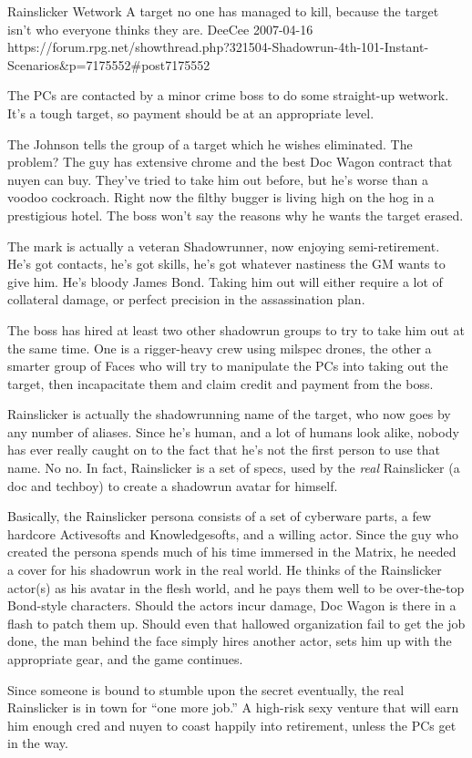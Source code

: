 \begin{scenario}{Rainslicker}
	{Wetwork}
	{A target no one has managed to kill, because the target isn't who everyone thinks they are.}
	{DeeCee}
	{2007-04-16}
	{https://forum.rpg.net/showthread.php?321504-Shadowrun-4th-101-Instant-Scenarios\&p=7175552\#post7175552}

The PCs are contacted by a minor crime boss to do some straight-up wetwork. It's a tough target, so payment should be at an appropriate level.

\synopsis The Johnson tells the group of a target which he wishes eliminated. The problem? The guy has extensive chrome and the best Doc Wagon contract that nuyen can buy. They've tried to take him out before, but he's worse than a voodoo cockroach. Right now the filthy bugger is living high on the hog in a prestigious hotel. The boss won't say the reasons why he wants the target erased.

The mark is actually a veteran Shadowrunner, now enjoying semi-retirement. He's got contacts, he's got skills, he's got whatever nastiness the GM wants to give him. He's bloody James Bond. Taking him out will either require a lot of collateral damage, or perfect precision in the assassination plan.

\twist The boss has hired at least two other shadowrun groups to try to take him out at the same time. One is a rigger-heavy crew using milspec drones, the other a smarter group of Faces who will try to manipulate the PCs into taking out the target, then incapacitate them and claim credit and payment from the boss.

\notes Rainslicker is actually the shadowrunning name of the target, who now goes by any number of aliases. Since he's human, and a lot of humans look alike, nobody has ever really caught on to the fact that he's not the first person to use that name. No no. In fact, Rainslicker is a set of specs, used by the \emph{real} Rainslicker (a doc and techboy) to create a shadowrun avatar for himself.

Basically, the Rainslicker persona consists of a set of cyberware parts, a few hardcore Activesofts and Knowledgesofts, and a willing actor. Since the guy who created the persona spends much of his time immersed in the Matrix, he needed a cover for his shadowrun work in the real world. He thinks of the Rainslicker actor(s) as his avatar in the flesh world, and he pays them well to be over-the-top Bond-style characters. Should the actors incur damage, Doc Wagon is there in a flash to patch them up. Should even that hallowed organization fail to get the job done, the man behind the face simply hires another actor, sets him up with the appropriate gear, and the game continues.

Since someone is bound to stumble upon the secret eventually, the real Rainslicker is in town for ``one more job.'' A high-risk sexy venture that will earn him enough cred and nuyen to coast happily into retirement, unless the PCs get in the way. 

\end{scenario}
